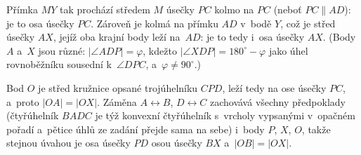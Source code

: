{    Přímka $MY$ tak prochází středem $M$ úsečky $PC$ kolmo na $PC$ (neboť $PC \parallel AD$): je to osa úsečky $PC$. Zároveň je kolmá na přímku $AD$ v~bodě $Y$, což je střed úsečky $AX$, jejíž oba krajní body leží na~$AD$: je to tedy i~osa úsečky $AX$. (Body $A$ a~$X$ jsou různé: $|\angle ADP| = \varphi$, kdežto $|\angle XDP| = 180^\circ - \varphi$ jako úhel rovnoběžníku sousední k~$\angle DPC$, a~$\varphi \neq 90^\circ$.)

    Bod $O$ je střed kružnice opsané trojúhelníku $CPD$, leží tedy na ose úsečky $PC$, a~proto $|OA| = |OX|$. Záměna $A \leftrightarrow B$, $D \leftrightarrow C$ zachovává všechny předpoklady (čtyřúhelník $BADC$ je týž konvexní čtyřúhelník s~vrcholy vypsanými v~opačném pořadí a~pětice úhlů ze zadání přejde sama na sebe) i~body $P$, $X$, $O$, takže stejnou úvahou je osa úsečky $PD$ osou úsečky $BX$ a~$|OB| = |OX|$.
}

